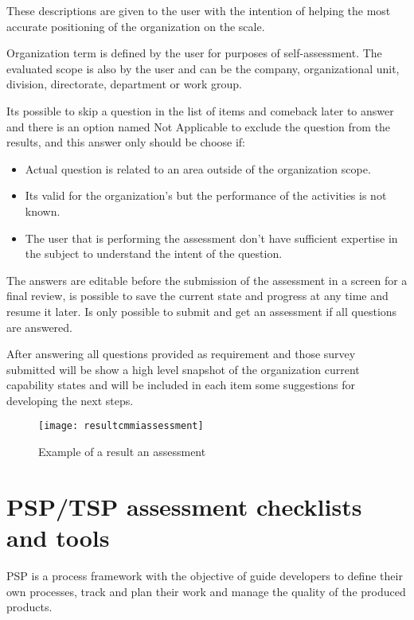 These descriptions are given to the user with the intention of helping the most accurate positioning of the organization on the scale.

Organization term is defined by the user for purposes of  self-assessment. The evaluated scope is also by the user and can be the company, organizational unit, division, directorate, department or work group.

Its possible to skip a question in the list of items and comeback later to answer and there is an option named Not Applicable to exclude the question from the results, and this answer only should be choose if:
\begin{itemize}
	\item Actual question is related to an area outside of the organization scope.
	\item Its valid for the organization's but the  performance of the activities is not known.
	\item The user that is performing the assessment don't have sufficient expertise in the subject to understand the intent of the question.
\end{itemize}

The answers are editable before the submission of the assessment in a screen for a final review, is possible to save the current state and progress at any time and resume it later. Is only possible to submit and get an assessment if all questions are answered.

After answering all questions provided as requirement and those survey submitted will be show a high level snapshot of the organization  current capability states and will be included in each item some suggestions for developing the next steps.

\newpage

\begin{figure}[h]
	\begin{center}
		\leavevmode
		\texttt{[image: resultcmmiassessment]}
		\caption{Example of a result an assessment}
		\label{fig:assesment_result}
	\end{center}
\end{figure}


\section{PSP/TSP assessment checklists and tools}

PSP\citep{humphrey2005psp} is a process framework with the objective of guide developers to define their own processes, track and plan their work and manage the quality of the produced products.


